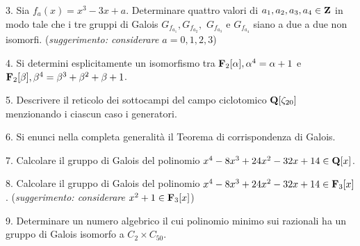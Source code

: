 \item{3.} Sia $f_a(x)=x^3-3x+a$. Determinare quattro valori di $a_1, a_2, a_3, a_4\in{\bf Z}$ in modo tale che i tre gruppi di Galois $G_{f_{a_1}}, 
G_{f_{a_2}},$ 
$G_{f_{a_3}}$ e $G_{f_{a_4}}$ siano a due a due non isomorfi. ({\it suggerimento: considerare $a=0,1,2,3$})
\bigskip



\item{4.} Si determini esplicitamente un isomorfismo tra ${\bf F}_2[\alpha], \alpha^4=\alpha+1$ e ${\bf F}_2[\beta], 
\beta^4=\beta^3+\beta^2+\beta+1$. 
\bigskip


\item{5.} Descrivere il reticolo dei sottocampi del campo ciclotomico ${\bf Q}[\zeta_{20}]$ menzionando i ciascun caso i generatori.

\bigskip



\item{6.} Si enunci nella completa generalit\`a il Teorema di
corrispondenza di Galois.
\bigskip


\item{7.} Calcolare il gruppo di Galois del polinomio $x^4 - 8x^3 + 24x^2 - 32x + 14
\in {\bf Q}[x]$.
\bigskip

\item{8.} Calcolare il gruppo di Galois del polinomio $x^4 - 8x^3 + 24x^2 - 32x + 14
\in {\bf F}_3[x]$. ({\it suggerimento: considerare $x^2+1\in {\bf F}_3[x]$})
\bigskip

\item{9.} Determinare un numero algebrico il cui polinomio minimo sui razionali ha un gruppo di 
Galois isomorfo a $C_{2}\times C_{50}$.

 \bye
